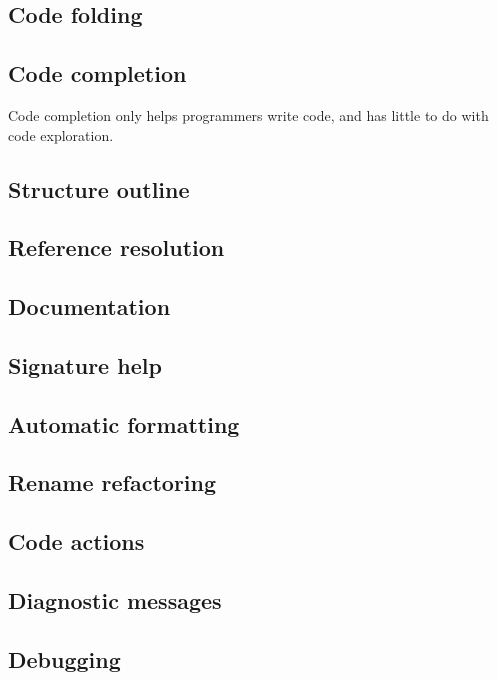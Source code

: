 \subsection*{Code folding}

\subsection*{Code completion}

Code completion only helps programmers write code, and has little to do with code exploration.

\subsection*{Structure outline}

\subsection*{Reference resolution}

\subsection*{Documentation}

\subsection*{Signature help}

\subsection*{Automatic formatting}

\subsection*{Rename refactoring}

\subsection*{Code actions}

\subsection*{Diagnostic messages}

\subsection*{Debugging}



